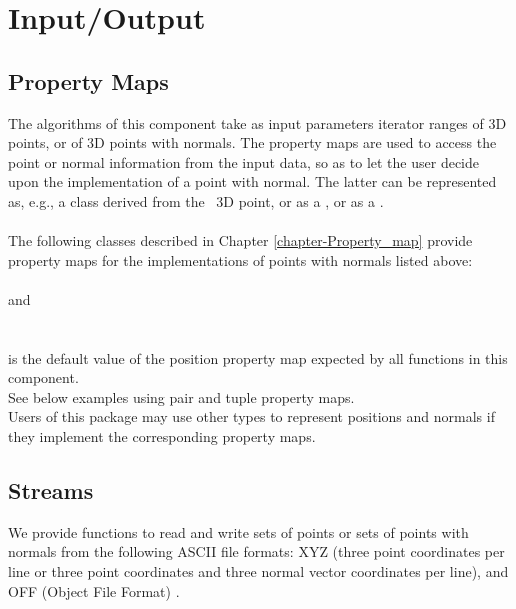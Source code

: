 \section{Input/Output}


\subsection{Property Maps}

The algorithms of this component take as input parameters iterator ranges of 3D points, or of 3D points with normals. The property maps are used to access the point or normal information from the input data, so as to let the user decide upon the implementation of a point with normal. The latter can be represented as, e.g., a class derived from the \cgal\ 3D point, or as a
, or as a .\\
\\
The following classes described in Chapter \ref {chapter-Property_map} provide property maps for the implementations of points with normals listed above:  \\
  \\
 and   \\
  \\
\\
 is the default value of the position property map expected by all functions in this component. \\
See below examples using pair and tuple property maps. \\
Users of this package may use other types to represent positions and normals if they implement the corresponding property maps.


\subsection{Streams}

We provide functions to read and write sets of points or sets of points with normals from the following ASCII file formats: XYZ (three point coordinates  per line or three point coordinates and three normal vector coordinates  per line), and OFF (Object File Format) \cite{cgal:p-gmgv16-96}.

